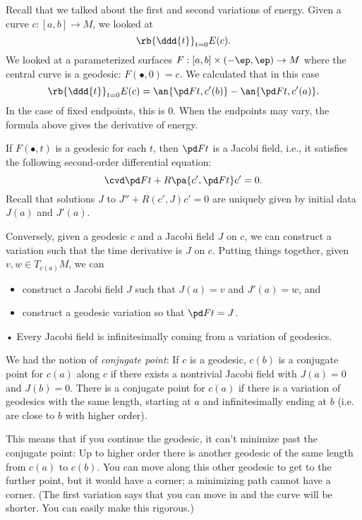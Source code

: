 
Recall that we talked about the first and second variations of energy. Given a curve $c:[a,b]\to M$, we looked at
\[
\rb{\ddd{t}}_{t=0} E(c).
\]
We looked at a parameterized surfaces $F:[a,b]\times (-\ep,\ep)\to M$ where the central curve is a geodesic: $F(\bullet, 0)=c$. We calculated that in this case
\[
\rb{\ddd{t}}_{t=0} E(c)=\an{\pd Ft,c'(b)}-\an{\pd Ft,c'(a)}.
\]
In the case of fixed endpoints, this is 0. When the endpoints may vary, the formula above gives the derivative of energy. %

If $F(\bullet,t)$ is a geodesic for each $t$, then $\pd Ft$ is a Jacobi field, i.e., it satisfies the following second-order differential equation:
\[
\cvd \pd Ft+R\pa{c',\pd Ft}c'=0.
\]
Recall that solutions $J$ to $J''+R(c',J)c'=0$ are uniquely given by initial data $J(a)$ and $J'(a)$. %

Conversely, given a geodesic $c$ and a Jacobi field $J$ on $c$, we can construct a variation such that the time derivative is $J$ on $c$. Putting things together, given $v,w\in T_{c(a)}M$, we can 
\begin{itemize}
\item
construct a Jacobi field $J$ such that $J(a)=v$ and $J'(a)=w$, and
\item
construct a geodesic variation so that $\pd Ft=J$.
\end{itemize}•
Every Jacobi field is infinitesimally coming from a variation of geodesics.

We had the notion of {\it conjugate point}: If $c$ is a geodesic, $c(b)$ is a conjugate point for $c(a)$ along $c$ if there exists a nontrivial Jacobi field with $J(a)=0$ and $J(b)=0$. There is a conjugate point for $c(a)$ if there is a variation of geodesics with the same length, starting at $a$ and infinitesimally ending at $b$ (i.e. are close to $b$ with higher order). %

This means that if you continue the geodesic, it can't minimize past the conjugate point: Up to higher order there is another geodesic of the same length from $c(a)$ to $c(b)$. You can move along this other geodesic to get to the further point, but it would have a corner; a minimizing path cannot have a corner. (The first variation says that you can move in and the curve will be shorter. You can easily make this rigorous.)

